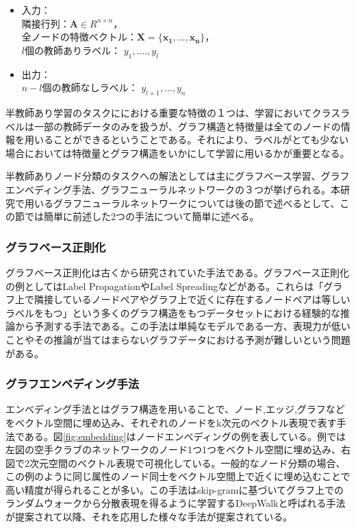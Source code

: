 \begin{itemize}
\item 入力：\\
隣接行列：$\mathbf{A} \in R^{n\times n}$，\\
全ノードの特徴ベクトル：$\mathbf{X}=\{\boldsymbol{x_{1}}, ..., \boldsymbol{x_{n}}\}$，\\
$l$個の教師ありラベル： $y_{1}, ...., y_{l}$
\item 出力：\\
$n-l$個の教師なしラベル： $y_{l+1}, ..., y_{n}$
\end{itemize}

半教師あり学習のタスクににおける重要な特徴の１つは、学習においてクラスラベルは一部の教師データのみを扱うが、グラフ構造と特徴量は全てのノードの情報を用いることができるということである。それにより、ラベルがとても少ない場合においては特徴量とグラフ構造をいかにして学習に用いるかが重要となる。

半教師ありノード分類のタスクへの解法としては主にグラフベース学習、グラフエンべディング手法、グラフニューラルネットワークの３つが挙げられる。本研究で用いるグラフニューラルネットワークについては後の節で述べるとして、この節では簡単に前述した2つの手法について簡単に述べる。

\subsubsection{グラフベース正則化}
グラフベース正則化は古くから研究されていた手法である\cite{belkin2004regularization, belkin2006manifold}。グラフベース正則化の例としてはLabel Propagation\cite{zhu2003semi}やLabel Spreading\cite{zhou2004learning}などがある。これらは「グラフ上で隣接しているノードペアやグラフ上で近くに存在するノードペアは等しいラベルをもつ」という多くのグラフ構造をもつデータセットにおける経験的な推論から予測する手法である。この手法は単純なモデルである一方、表現力が低いことやその推論が当てはまらないグラフデータにおける予測が難しいという問題がある。

\subsubsection{グラフエンベディング手法}
エンべディング手法とはグラフ構造を用いることで、ノード,エッジ,グラフなどをベクトル空間に埋め込み、それぞれのノードをk次元のベクトル表現で表す手法である\cite{cai2017graph_embedding_survey}。図\ref{fig:embedding}はノードエンべディングの例を表している。例では左図の空手クラブのネットワークのノード1つ1つをベクトル空間に埋め込み、右図で2次元空間のベクトル表現で可視化している。一般的なノード分類の場合、この例のように同じ属性のノード同士をベクトル空間上で近くに埋め込むことで高い精度が得られることが多い。この手法はskip-gram\cite{mikolov2013distributed}に基づいてグラフ上でのランダムウォークから分散表現を得るように学習するDeepWalk\cite{Perozzi2014deep}と呼ばれる手法が提案されて以降、それを応用した様々な手法が提案されている\cite{grover2016node2vec,tang2015line,wang2016SDNE,ribeiro2017struc2vec}。


